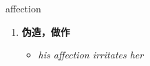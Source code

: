 
\begin{frame}
{\huge affection}
\begin{center}
\begin{enumerate}\Large
  \item \textbf{伪造，做作}
  \begin{itemize}
    \item \em{\Large{his affection irritates her}}
  \end{itemize}
\end{enumerate}
\end{center}
\end{frame}
